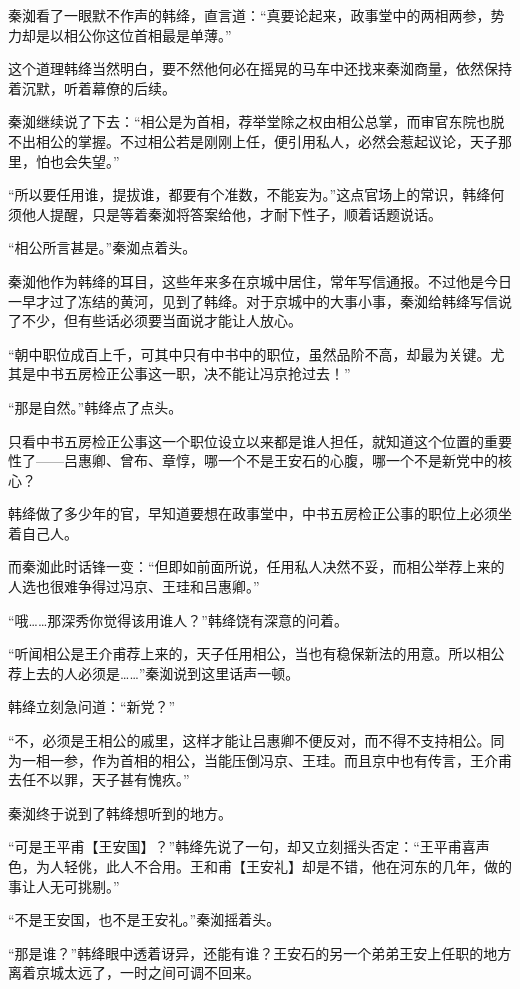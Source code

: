 秦洳看了一眼默不作声的韩绛，直言道：“真要论起来，政事堂中的两相两参，势力却是以相公你这位首相最是单薄。”

这个道理韩绛当然明白，要不然他何必在摇晃的马车中还找来秦洳商量，依然保持着沉默，听着幕僚的后续。

秦洳继续说了下去：“相公是为首相，荐举堂除之权由相公总掌，而审官东院也脱不出相公的掌握。不过相公若是刚刚上任，便引用私人，必然会惹起议论，天子那里，怕也会失望。”

“所以要任用谁，提拔谁，都要有个准数，不能妄为。”这点官场上的常识，韩绛何须他人提醒，只是等着秦洳将答案给他，才耐下性子，顺着话题说话。

“相公所言甚是。”秦洳点着头。

秦洳他作为韩绛的耳目，这些年来多在京城中居住，常年写信通报。不过他是今日一早才过了冻结的黄河，见到了韩绛。对于京城中的大事小事，秦洳给韩绛写信说了不少，但有些话必须要当面说才能让人放心。

“朝中职位成百上千，可其中只有中书中的职位，虽然品阶不高，却最为关键。尤其是中书五房检正公事这一职，决不能让冯京抢过去！”

“那是自然。”韩绛点了点头。

只看中书五房检正公事这一个职位设立以来都是谁人担任，就知道这个位置的重要性了——吕惠卿、曾布、章惇，哪一个不是王安石的心腹，哪一个不是新党中的核心？

韩绛做了多少年的官，早知道要想在政事堂中，中书五房检正公事的职位上必须坐着自己人。

而秦洳此时话锋一变：“但即如前面所说，任用私人决然不妥，而相公举荐上来的人选也很难争得过冯京、王珪和吕惠卿。”

“哦……那深秀你觉得该用谁人？”韩绛饶有深意的问着。

“听闻相公是王介甫荐上来的，天子任用相公，当也有稳保新法的用意。所以相公荐上去的人必须是……”秦洳说到这里话声一顿。

韩绛立刻急问道：“新党？”

“不，必须是王相公的戚里，这样才能让吕惠卿不便反对，而不得不支持相公。同为一相一参，作为首相的相公，当能压倒冯京、王珪。而且京中也有传言，王介甫去任不以罪，天子甚有愧疚。”

秦洳终于说到了韩绛想听到的地方。

“可是王平甫【王安国】？”韩绛先说了一句，却又立刻摇头否定：“王平甫喜声色，为人轻佻，此人不合用。王和甫【王安礼】却是不错，他在河东的几年，做的事让人无可挑剔。”

“不是王安国，也不是王安礼。”秦洳摇着头。

“那是谁？”韩绛眼中透着讶异，还能有谁？王安石的另一个弟弟王安上任职的地方离着京城太远了，一时之间可调不回来。

